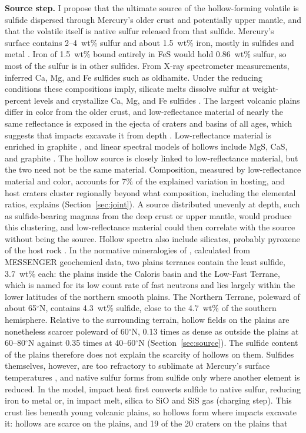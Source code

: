\documentclass[article,review]{planetary}
\begin{document}
\textbf{Source step.} I propose that the ultimate source of the hollow-forming volatile is sulfide dispersed through Mercury's older crust and potentially upper mantle, and that the volatile itself is native sulfur released from that sulfide. Mercury's surface contains 2--4~wt\% sulfur \parencite{nittler2011,weider2015} and about 1.5~wt\% iron, mostly in sulfides and metal \parencite{weider2014}. Iron of 1.5~wt\% bound entirely in FeS would hold 0.86~wt\% sulfur, so most of the sulfur is in other sulfides. From X-ray spectrometer measurements, \textcite{weiderChemicalHeterogeneityMercurys2012} inferred Ca, Mg, and Fe sulfides such as oldhamite. Under the reducing conditions these compositions imply, silicate melts dissolve sulfur at weight-percent levels and crystallize Ca, Mg, and Fe sulfides \parencite{namur2016,anzures2020,boukare2019}. The largest volcanic plains differ in color from the older crust, and low-reflectance material of nearly the same reflectance is exposed in the ejecta of craters and basins of all ages, which suggests that impacts excavate it from depth \parencite{murchie2015}. Low-reflectance material is enriched in graphite \parencite{peplowski2016,klima2018,vanderkaaden2015}, and linear spectral models of hollows include MgS, CaS, and graphite \parencite{emran2025}. The hollow source is closely linked to low-reflectance material, but the two need not be the same material. Composition, measured by low-reflectance material and color, accounts for 7\% of the explained variation in hosting, and host craters cluster regionally beyond what composition, including the elemental ratios, explains (Section~\ref{sec:joint}). A source distributed unevenly at depth, such as sulfide-bearing magmas from the deep crust or upper mantle, would produce this clustering, and low-reflectance material could then correlate with the source without being the source. Hollow spectra also include silicates, probably pyroxene of the host rock \parencite{lucchetti2018}. In the normative mineralogies of \textcite{mccoy2018}, calculated from MESSENGER geochemical data, two plains terranes contain the least sulfide, 3.7~wt\% each: the plains inside the Caloris basin and the Low-Fast Terrane, which is named for its low count rate of fast neutrons and lies largely within the lower latitudes of the northern smooth plains. The Northern Terrane, poleward of about 65$^\circ$N, contains 4.3~wt\% sulfide, close to the 4.7~wt\% of the southern hemisphere. Relative to the surrounding terrain, hollow fields on the plains are nonetheless scarcer poleward of 60$^\circ$N, 0.13 times as dense as outside the plains at 60--80$^\circ$N against 0.35 times at 40--60$^\circ$N (Section~\ref{sec:source}). The sulfide content of the plains therefore does not explain the scarcity of hollows on them. Sulfides themselves, however, are too refractory to sublimate at Mercury's surface temperatures \parencite{phillips2021}, and native sulfur forms from sulfide only where another element is reduced. In the model, impact heat first converts sulfide to native sulfur, reducing iron to metal or, in impact melt, silica to SiO and SiS gas (charging step). This crust lies beneath young volcanic plains, so hollows form where impacts excavate it: hollows are scarce on the plains, and 19 of the 20 craters on the plains that 
\end{document}
